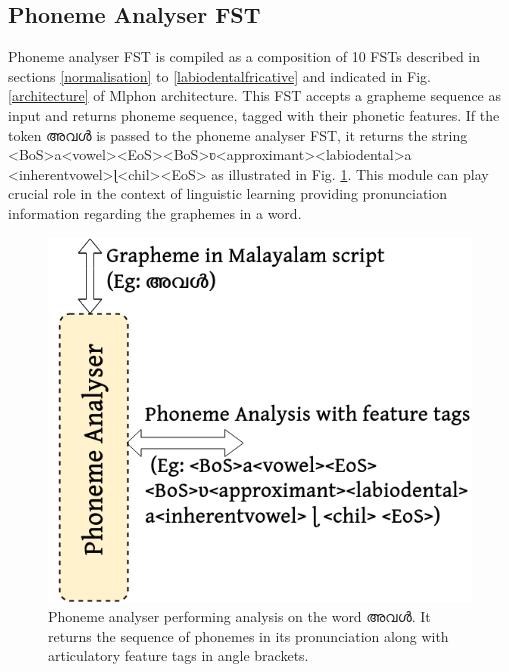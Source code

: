 \documentclass{ieeeaccess}
\begin{document}


\subsection{Phoneme Analyser FST}

Phoneme analyser FST is compiled as a composition of 10 FSTs described in  sections \ref{normalisation} to \ref{labiodentalfricative} and indicated in Fig. \ref{architecture} of Mlphon architecture. This FST accepts a grapheme sequence as input and returns phoneme sequence, tagged with their phonetic features.  If the token {\mal അവൾ } is passed to the phoneme analyser FST, it returns the string  {\ipa <BoS>a<vowel><EoS><BoS>ʋ<approximant><labiodental>a
<inherentvowel>ɭ<chil><EoS>} as illustrated in Fig. \ref{analysisblock}. This module can play crucial role in the context of linguistic learning providing pronunciation information regarding the graphemes in a word.


\begin{figure}[h]
	\centering
	\includegraphics[width=0.6\linewidth]{analysisbox-drawio.png}
	\caption{Phoneme analyser performing analysis on the word {\mal അവൾ}. It returns the sequence of phonemes in its pronunciation along with articulatory feature tags in angle brackets.}
	\label{analysisblock}
\end{figure}
\end{document}
